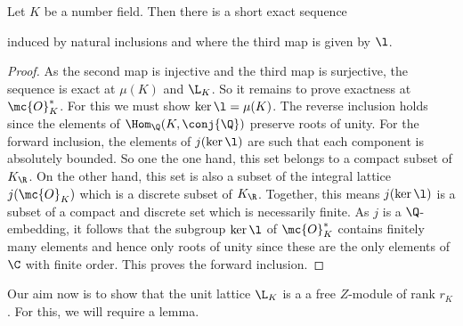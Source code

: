 \documentclass[12pt]{article}
\begin{document}
      \begin{proposition}\label{prop:exact_sequence_for_Dirichlets_unit_theorem}
        Let \(K\) be a number field. Then there is a short exact sequence

        \begin{center}
        \end{center}
        induced by natural inclusions and where the third map is given by \(\l\).
      \end{proposition}
      \begin{proof}
        As the second map is injective and the third map is surjective, the sequence is exact at \(\mu(K)\) and \(\L_{K}\). So it remains to prove exactness at \(\mc{O}_{K}^{\ast}\). For this we must show \(\ker\l = \mu(K)\). The reverse inclusion holds since the elements of \(\Hom_{\Q}(K,\conj{\Q})\) preserve roots of unity. For the forward inclusion, the elements of \(j(\ker\l)\) are such that each component is absolutely bounded. So one the one hand, this set belongs to a compact subset of \(K_{\R}\). On the other hand, this set is also a subset of the integral lattice \(j(\mc{O}_{K})\) which is a discrete subset of \(K_{\R}\). Together, this means \(j(\ker\l)\) is a subset of a compact and discrete set which is necessarily finite. As \(j\) is a \(\Q\)-embedding, it follows that the subgroup \(\ker\l\) of \(\mc{O}_{K}^{\ast}\) contains finitely many elements and hence only roots of unity since these are the only elements of \(\C\) with finite order. This proves the forward inclusion.
      \end{proof}

      Our aim now is to show that the unit lattice \(\L_{K}\) is a a free \(Z\)-module of rank \(r_{K}\). For this, we will require a lemma.
\end{document}
